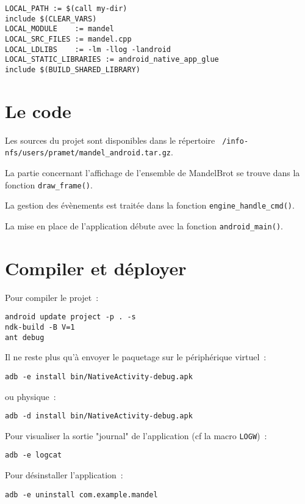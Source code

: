 \documentclass[a4paper]{article}
\theoremstyle{break}
\begin{document}
\begin{verbatim}
LOCAL_PATH := $(call my-dir)
include $(CLEAR_VARS)
LOCAL_MODULE    := mandel
LOCAL_SRC_FILES := mandel.cpp
LOCAL_LDLIBS    := -lm -llog -landroid
LOCAL_STATIC_LIBRARIES := android_native_app_glue
include $(BUILD_SHARED_LIBRARY)
\end{verbatim}

\section{Le code}

Les sources du projet sont disponibles dans le répertoire {\tt
  /info-nfs/users/pramet/mandel\_android.tar.gz}.

La partie concernant l'affichage de l'ensemble de MandelBrot se trouve
dans la fonction {\tt draw\_frame()}. 

La gestion des évènements est
traitée dans la fonction {\tt engine\_handle\_cmd()}.

La mise en place de l'application débute avec la fonction {\tt android\_main()}.

\newpage

\section{Compiler et déployer}

Pour compiler le projet~:

\begin{verbatim}
android update project -p . -s
ndk-build -B V=1
ant debug
\end{verbatim}

Il ne reste plus qu'à envoyer le paquetage sur le périphérique
virtuel~:

\begin{verbatim}
adb -e install bin/NativeActivity-debug.apk
\end{verbatim}

ou physique~:

\begin{verbatim}
adb -d install bin/NativeActivity-debug.apk
\end{verbatim}

Pour visualiser la sortie "journal" de l'application (cf la macro {\tt LOGW})~:

\begin{verbatim}
adb -e logcat
\end{verbatim}

Pour désinstaller l'application~:

\begin{verbatim}
adb -e uninstall com.example.mandel
\end{verbatim}
\end{document}
